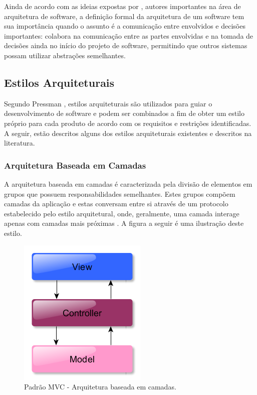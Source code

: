 Ainda de acordo com as ideias expostas por \cite{bass_software_archi_practice_2003}, autores importantes na área de arquitetura de software, a definição formal da arquitetura de um software tem sua importância quando o assunto é a comunicação entre envolvidos e decisões importantes: colabora na comunicação entre as partes envolvidas e na tomada de decisões ainda no início do projeto de software, permitindo que outros sistemas possam utilizar abstrações semelhantes.

\subsection{Estilos Arquiteturais}
Segundo Pressman \cite{pressman2006engenharia}, estilos arquiteturais são utilizados para guiar o desenvolvimento de software e podem ser combinados a fim de obter um estilo próprio para cada produto de acordo com os requisitos e restrições identificadas. A seguir, estão descritos alguns dos estilos arquiteturais existentes e descritos na literatura.

\subsubsection{Arquitetura Baseada em Camadas}
A arquitetura baseada em camadas é caracterizada pela divisão de elementos em grupos que possuem responsabilidades semelhantes. Estes grupos compõem camadas da aplicação e estas conversam entre si através de um protocolo estabelecido pelo estilo arquitetural, onde, geralmente, uma camada interage apenas com camadas mais próximas \cite{pressman2006engenharia}. A figura a seguir é uma ilustração deste estilo.

\begin{figure}[htb]
\centering
\includegraphics[scale=0.5]{figuras/modelo_mvc.PNG}
\caption{Padrão MVC - Arquitetura baseada em camadas.}
\label{modelo_mvc}
\end{figure}

